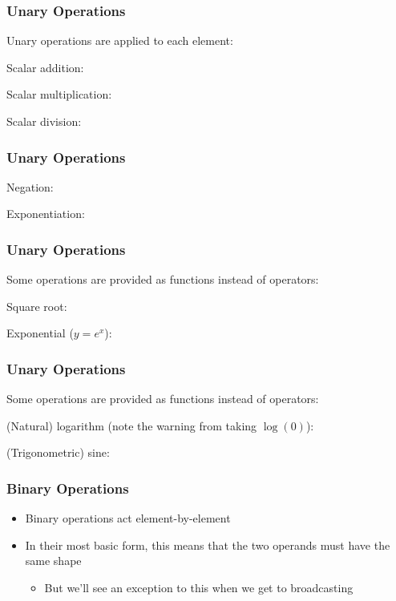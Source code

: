\documentclass[xcolor={x11names,table}]{beamer}
\begin{document}
\begin{frame}
	\frametitle{Unary Operations}
	Unary operations are applied to each element:
	
	Scalar addition:
	
	Scalar multiplication:
	
	Scalar division:
	
\end{frame}

\begin{frame}
	\frametitle{Unary Operations}
	
	Negation:
	
	Exponentiation:
	
\end{frame}

\begin{frame}
	\frametitle{Unary Operations}
	Some operations are provided as functions instead of operators:
	
	Square root:
	
	Exponential ($y=e^{x}$):
	
\end{frame}

\begin{frame}
	\frametitle{Unary Operations}
	Some operations are provided as functions instead of operators:
	
	(Natural) logarithm (note the warning from taking $\log(0)$):
	
	(Trigonometric) sine:
	
\end{frame}

\begin{frame}
	\frametitle{Binary Operations}
	\begin{itemize}
		\item Binary operations act element-by-element
		\item In their most basic form, this means that the two operands must have the same shape
		\begin{itemize}
			\item But we'll see an exception to this when we get to broadcasting
		\end{itemize}
	\end{itemize}
\end{frame}
\end{document}

